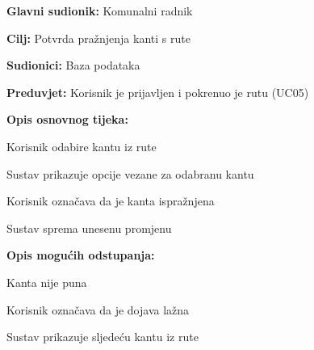 				
				
					\noindent {}
					\begin{packed_item}
	
						\item \textbf{Glavni sudionik: }Komunalni radnik
						\item  \textbf{Cilj:} Potvrda pražnjenja kanti s rute
						\item  \textbf{Sudionici:} Baza podataka
						\item  \textbf{Preduvjet:} Korisnik je prijavljen i pokrenuo je rutu (UC05)
						\item  \textbf{Opis osnovnog tijeka:}
						
						\item[] \begin{packed_enum}
	
							\item Korisnik odabire kantu iz rute
							\item Sustav prikazuje opcije vezane za odabranu kantu
							\item Korisnik označava da je kanta ispražnjena
							\item Sustav sprema unesenu promjenu
							
						\end{packed_enum}
						
						\item  \textbf{Opis mogućih odstupanja:}
						
						\item[] \begin{packed_item}
	
							\item[3.a] Kanta nije puna
							
							\item[] \begin{packed_enum}
								
								\item Korisnik označava da je dojava lažna
								\item Sustav prikazuje sljedeću kantu iz rute
								
							\end{packed_enum}
						\end{packed_item}
					\end{packed_item}
				
				
					
				
				
